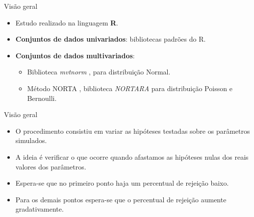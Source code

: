 \documentclass[
  ignorenonframetext,
  serif,
  professionalfont,
  usenames,
  dvipsnames,
  aspectratio = 169]{beamer}
\begin{document}
\begin{frame}{Visão geral}
\protect\hypertarget{visuxe3o-geral-2}{}
\begin{itemize}
    \itemsep 2ex
    
  \item Estudo realizado na linguagem \textbf{R}.

  \item \textbf{Conjuntos de dados univariados}: bibliotecas padrões do R. 

  \item \textbf{Conjuntos de dados multivariados}:
    \begin{itemize}
      \item Biblioteca \emph{mvtnorm} \citep{mvtnorm1}, \citep{mvtnorm2} para distribuição Normal.

        \item Método NORTA \citep{cario1997modeling}, biblioteca \emph{NORTARA} \citep{nortara} para distribuição Poisson e Bernoulli.
    \end{itemize}
\end{itemize}
\end{frame}

\begin{frame}{Visão geral}
\protect\hypertarget{visuxe3o-geral-3}{}
\begin{itemize}
  \itemsep 2ex
    
  \item O procedimento consistiu em variar as hipóteses testadas sobre os parâmetros simulados. 

  \item A ideia é verificar o que ocorre quando afastamos as hipóteses nulas dos reais valores dos parâmetros. 

  \item Espera-se que no primeiro ponto haja um percentual de rejeição baixo. 

  \item Para os demais pontos espera-se que o percentual de rejeição aumente gradativamente.
  
\end{itemize}
\end{frame}
\end{document}
